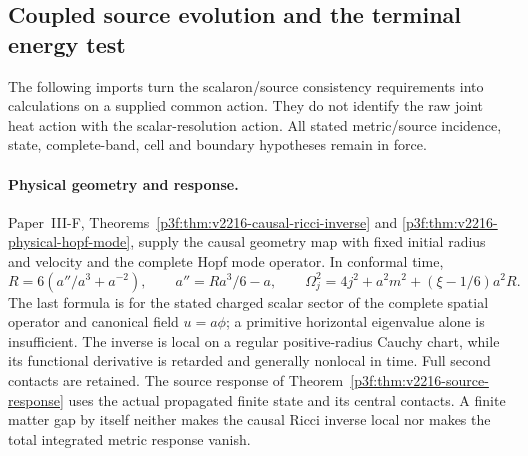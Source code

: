 \documentclass[12pt,a4paper]{article}
\begin{document}
\subsection{Coupled source evolution and the terminal energy test}
\label{p8:sec:v2216-coupled-closure-imports}

The following imports turn the scalaron/source consistency requirements
into calculations on a supplied common action.  They do not identify the
raw joint heat action with the scalar-resolution action.  All stated
metric/source incidence, state, complete-band, cell and boundary hypotheses
remain in force.

\paragraph{Physical geometry and response.}
Paper~III-F, Theorems~\ref{p3f:thm:v2216-causal-ricci-inverse} and
\ref{p3f:thm:v2216-physical-hopf-mode}, supply the causal geometry
map with fixed initial radius and velocity and the complete Hopf mode
operator.  In conformal time,
\[
 R=6(a''/a^3+a^{-2}),\qquad a''=Ra^3/6-a,
 \qquad
 \Omega_j^2=4j^2+a^2m^2+(\xi-1/6)a^2R.
\]
The last formula is for the stated charged scalar sector of the complete
spatial operator and canonical field $u=a\phi$; a primitive horizontal
eigenvalue alone is insufficient.  The inverse is local on a regular
positive-radius Cauchy chart, while its functional derivative is retarded
and generally nonlocal in time.  Full second contacts are retained.
The source response of Theorem~\ref{p3f:thm:v2216-source-response}
uses the actual propagated finite state and its central contacts.
A finite matter gap by itself neither makes the causal Ricci inverse
local nor makes the total integrated metric response vanish.
\end{document}
